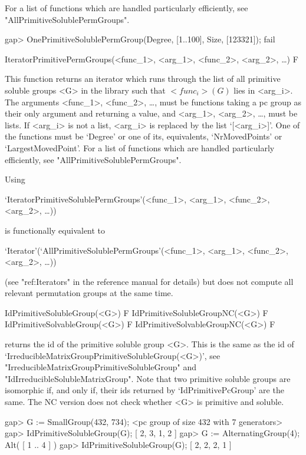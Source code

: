 For a list of functions which are handled particularly efficiently, see
"AllPrimitiveSolublePermGroups".

\beginexample
gap> OnePrimitiveSolublePermGroup(Degree, [1..100], Size, [123321]);
fail
\endexample

\>IteratorPrimitivePermGroups(<func_1>, <arg_1>, <func_2>, <arg_2>, \dots) F

This function returns an iterator which runs through the list of all primitive soluble
groups <G> in the  {\IRREDSOL} library such that
$<func_i>(G)$ lies in <arg_i>. The arguments <func_1>, <func_2>, \dots,
must be {\GAP} functions taking a pc group as their only argument and returning 
a value, and <arg_1>, <arg_2>, \dots, 
must be lists. If <arg_i> is not a list, <arg_i> is replaced by the list `[<arg_i>]'.
One of the functions must be `Degree' or one of its, equivalents, `NrMovedPoints' 
or `LargestMovedPoint'.
For a list of functions which are handled particularly efficiently, see
"AllPrimitiveSolublePermGroups".

Using 

`IteratorPrimitiveSolublePermGroups'(<func_1>, <arg_1>, <func_2>, <arg_2>, \dots)) 

is functionally equivalent to 

`Iterator'(`AllPrimitiveSolublePermGroups'(<func_1>, <arg_1>, <func_2>, <arg_2>, \dots))

(see "ref:Iterators" in the {\GAP} reference manual for details) but does not 
compute all relevant permutation groups at the same time. 



\>IdPrimitiveSolubleGroup(<G>) F
\>IdPrimitiveSolubleGroupNC(<G>) F
\>IdPrimitiveSolvableGroup(<G>) F
\>IdPrimitiveSolvableGroupNC(<G>) F

returns the id of the primitive soluble group <G>. This is the same as
the id of `IrreducibleMatrixGroupPrimitiveSolubleGroup(<G>)', see "IrreducibleMatrixGroupPrimitiveSolubleGroup" and "IdIrreducibleSolubleMatrixGroup".
Note that two primitive soluble groups are isomorphic if, and only if, their
ids returned by `IdPrimitivePcGroup' are the same. The NC version does not
check whether <G> is primitive and soluble.

\beginexample
gap> G := SmallGroup(432, 734);
<pc group of size 432 with 7 generators>
gap> IdPrimitiveSolubleGroup(G);
[ 2, 3, 1, 2 ]
gap> G := AlternatingGroup(4);
Alt( [ 1 .. 4 ] )
gap> IdPrimitiveSolubleGroup(G);
[ 2, 2, 2, 1 ]
\endexample

